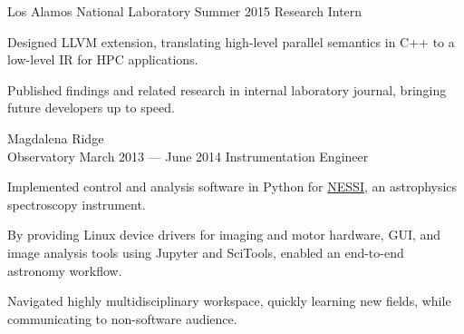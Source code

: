 \documentclass{tc_cv}
\newcommand{\jobSpace}{\vspace{0.75em}}
\begin{document}
\begin{minipage}[t]{0.6\linewidth}
  \jobSpace
  \begin{job}{Los Alamos National Laboratory}
    {Summer 2015}
    {Research Intern}
    \item Designed LLVM extension, translating high-level parallel
      semantics in C++ to a low-level IR for HPC applications.
    \item Published findings and related research in internal laboratory
      journal, bringing future developers up to speed.
  \end{job}
  \jobSpace
  \begin{job}{Magdalena Ridge \\ Observatory}
    {March 2013 --- June 2014}
    {Instrumentation Engineer}
    \item Implemented control and analysis software in Python for
      \href{https://noirlab.edu/public/programs/kitt-peak-national-observatory/wiyn-35m-telescope/nessi/}{NESSI},
      an astrophysics spectroscopy instrument.
    \item By providing Linux device drivers for imaging and motor hardware,
      GUI, and image analysis tools using Jupyter and SciTools, enabled an
      end-to-end astronomy workflow.
    \item Navigated highly multidisciplinary workspace, quickly learning new
      fields, while communicating to non-software audience.
  \end{job}
\end{minipage}
\end{document}
